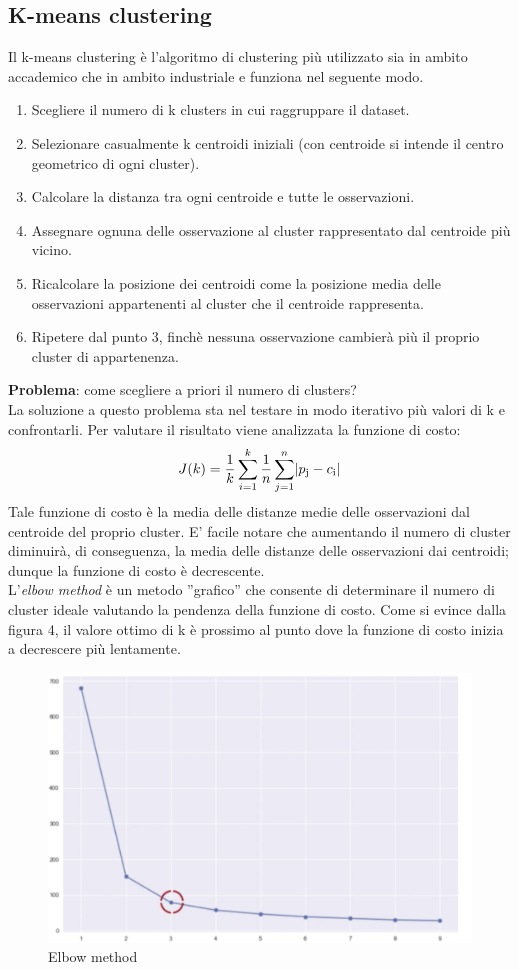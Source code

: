\documentclass[10pt,a4paper]{report}
\DeclarePairedDelimiter\abs{\lvert}{\rvert}
\begin{document}
        		\subsection{K-means clustering}
        		Il k-means clustering è l'algoritmo di clustering più utilizzato sia in ambito accademico che in ambito industriale e funziona nel seguente modo.
        		\begin{enumerate}
        		\item Scegliere il numero di k clusters in cui raggruppare il dataset.
        		\item Selezionare casualmente k centroidi iniziali (con centroide si intende il centro geometrico di ogni cluster).
        		\item Calcolare la distanza tra ogni centroide e tutte le osservazioni.
        		\item Assegnare ognuna delle osservazione al cluster rappresentato dal centroide più vicino.
        		\item Ricalcolare la posizione dei centroidi come la posizione media delle osservazioni appartenenti al cluster che il centroide rappresenta.
        		\item Ripetere dal punto 3, finchè nessuna osservazione cambierà più il proprio cluster di appartenenza.
        		\end{enumerate}
		\textbf{Problema}: come scegliere a priori il numero di clusters?\\
		La soluzione a questo problema sta nel testare in modo iterativo più valori di k e confrontarli. 
		Per valutare il risultato viene analizzata la funzione di costo:
		\[
		J(k)=\frac{1}{k}
		\sum_{i=1}^k
		\frac{1}{n}
		\sum_{j=1}^n
		\abs{p\textsubscript{j}-c\textsubscript{i}}
		\]
		Tale funzione di costo è la media delle distanze medie delle osservazioni dal centroide del proprio cluster. E' facile notare che aumentando il numero di
		cluster diminuirà, di conseguenza, la media delle distanze delle osservazioni dai centroidi; dunque la funzione di costo è decrescente.\\
		L'\textit{elbow method} è un metodo ''grafico'' che consente di determinare il numero di cluster ideale valutando la pendenza della funzione di costo.
		Come si evince dalla figura 4, il valore ottimo di k è prossimo al punto dove la funzione di costo inizia a decrescere più lentamente.
		\begin{figure}[H]
		\centering
		\includegraphics[scale=0.5]{elbow_method.png}
		\caption{Elbow method}
		\end{figure}
		
		
        
       
        
        
        
\end{document}
